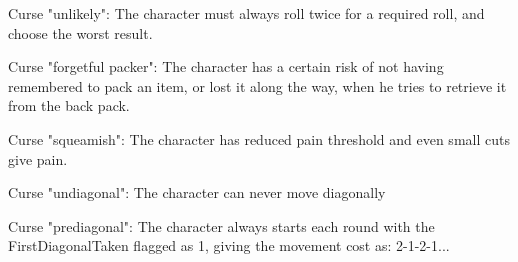 Curse "unlikely": The character must always roll twice for a required roll, and choose the worst result.


Curse "forgetful packer": The character has a certain risk of not having remembered to pack an item, or lost it along the way, when he tries to retrieve it from the back pack.


Curse "squeamish": The character has reduced pain threshold and even small cuts give pain.


Curse "undiagonal": The character can never move diagonally


Curse "prediagonal": The character always starts each round with the FirstDiagonalTaken flagged as 1, giving the movement cost as: 2-1-2-1...










